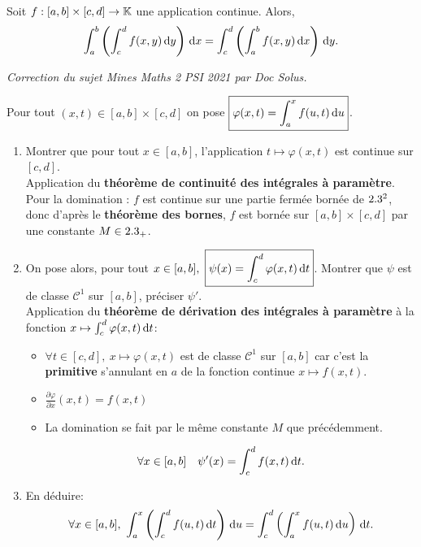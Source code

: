 
\begin{theo}
    Soit $f: [a,b] \times [c, d] \to \mathbb{K}$ une application continue. Alors,
    $$\int_{a}^{b} \left ( \int_{c}^{d} f(x,y) \, \mathrm{d} y \right) \, \mathrm{d} x = \int_{c}^{d} \left ( \int_{a}^{b} f(x,y) \, \mathrm{d} x \right) \, \mathrm{d} y.$$
\end{theo}

\textit{Correction du sujet Mines Maths 2 PSI 2021 par Doc Solus.} 
\begin{preuve}
    Pour tout $(x, t) \in [a, b] \times [c, d]$ on pose $\boxed{\varphi(x, t) = \int_{a}^{x} f(u, t) \, \mathrm{d} u}$. 
    \begin{enumerate}
        \item Montrer que pour tout $x \in [a, b]$, l'application $t \mapsto \varphi(x, t)$ est continue sur $[c, d]$. \\
        Application du \textbf{théorème de continuité des intégrales à paramètre}. \\
        Pour la domination : $f$ est continue sur une partie fermée bornée de $2.3^2$, donc d'après le \textbf{théorème des bornes}, $f$ est bornée sur $[a, b] \times [c, d]$ par une constante $M \in 2.3_+$.
        \item On pose alors, pour tout $x  \in [a, b],\ \boxed{\psi(x) = \int_{c}^{d} \varphi(x, t) \, \mathrm{d} t}$. Montrer que $\psi$ est de classe $\mathscr{C}^1$ sur $[a, b]$, préciser $\psi'$. \\
        Application du \textbf{théorème de dérivation des intégrales à paramètre} à la fonction $x \mapsto \int_{c}^{d} \varphi(x, t) \, \mathrm{d} t$:
        \begin{itemize}
            \item $\forall t \in [c, d],\ x \mapsto \varphi(x, t)$ est de classe $\mathscr{C}^1$ sur $[a, b]$ car c'est la \textbf{primitive} s'annulant en $a$ de la fonction continue $x \mapsto f(x, t)$. 
            \item $\frac{\partial \varphi}{\partial x}(x, t) = f(x, t)$
            \item La domination se fait par le même constante $M$ que précédemment. 
        \end{itemize}
        $$\forall x \in [a, b] \quad \psi'(x) = \int_{c}^{d} f(x, t) \, \mathrm{d} t.$$
        \item En déduire:
        $$\forall x \in [a, b],\ \int_{a}^{x} \left ( \int_{c}^{d} f(u,t) \d t \right) \d u = \int_{c}^{d} \left ( \int_{a}^{x} f(u,t) \d u \right) \d t.$$

\end{enumerate}
\end{preuve}

